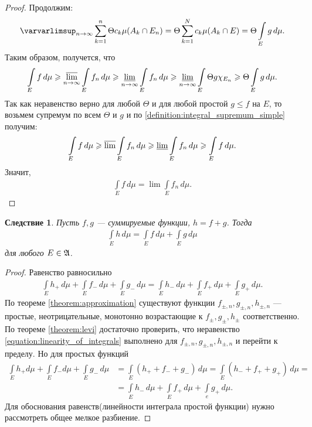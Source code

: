 \documentclass[a4paper,14pt]{extarticle}
\newcounter{theoremCnt}
\theoremstyle{definition}
\theoremstyle{plain}
\theoremstyle{plain}
\theoremstyle{plain}
\newtheorem{crly}[theoremCnt]{Следствие}
\theoremstyle{plain}
\theoremstyle{definition}
\theoremstyle{definition}
\theoremstyle{definition}
\theoremstyle{definition}
\theoremstyle{definition}
\theoremstyle{definition}
\theoremstyle{plain}
\theoremstyle{plain}
\theoremstyle{plain}
\theoremstyle{plain}
\theoremstyle{definition}
\theoremstyle{definition}
\theoremstyle{definition}
\theoremstyle{definition}
\theoremstyle{definition}
\newcommand{\A}{\ensuremath \mathfrak{A}}
\begin{document}
\begin{proof}
Продолжим: \begin{align*}
 \varvarlimsup_{n \to \infty} \sum_{k=1}^{n} \Theta c_k \mu(A_k \cap E_n) = \Theta \sum_{k=1}^{N} c_k \mu(A_k \cap E) = \Theta \int\limits_E g \, d\mu
.\end{align*}  Таким образом, получется, что \begin{align*}
\int\limits_E f \, d\mu \geqslant \varlimsup_{n \to \infty} \int\limits_E f_n\, d\mu \geqslant \varliminf_{n \to \infty} \int\limits_E f_n \, d\mu \geqslant \varliminf_{n \to \infty} \int\limits_E \Theta g \chi_{E_n} \geqslant \Theta \int\limits_E g\, d\mu
.\end{align*} Так как неравенство верно для любой $\Theta$ и для любой простой $g \leqslant f$ на $E $, то возьмем супремум по всем $\Theta$ и $g$ и по \ref{definition:integral_supremum_simple} получим: \begin{align*}
\int\limits_E f \, d\mu \geqslant \varlimsup \int\limits_E f_n \, d\mu \geqslant \varliminf \int\limits_E f_n \, d\mu \geqslant \int\limits_E f \, d\mu
.\end{align*} Значит, \begin{align*}
 \int\limits_E f \, d\mu = \lim \int\limits_E f_n \, d\mu
.\end{align*} 
\end{proof}
\begin{crly}
 Пусть $f,g$ --- суммируемые функции,  $h = f + g$. Тогда \begin{align*}
  \int\limits_E h \, d\mu = \int\limits_E f\, d\mu + \int\limits_E g \, d\mu
 \end{align*} для любого $E \in \A$.
\end{crly}
\begin{proof}
 Равенство равносильно 
 \begin{align}
 \label{equation:linearity_of_integrals}
  \int\limits_E h_+ \, d\mu + \int\limits_E f_- \, d\mu + \int\limits_E g_- \, d\mu = \int\limits_E h_- \, d\mu + \int\limits_E f_+ \, d\mu + \int\limits_E g_+ \, d\mu
 .\end{align} По теореме \ref{theorem:approximation} существуют функции $f_{\pm,n}, g_{\pm,n}, h_{\pm,n}$ --- простые, неотрицательные, монотонно возрастающие к  $f_{\pm}, g_{\pm}, h_{\pm}$ соответственно.
 По теореме \ref{theorem:levi} достаточно проверить, что неравенство \eqref{equation:linearity_of_integrals} выполнено для $f_{\pm,n}, g_{\pm,n}, h_{\pm,n}$ и перейти к пределу.
 Но для простых функций
 \begin{align*}
 \int\limits_E h_+ d\mu + \int\limits_E f_- d\mu + \int\limits_E g_- \,d\mu &= \int\limits_E \left( h_+ + f_- + g_- \right) \,d\mu = \int\limits_E \left( h_- + f_+ + g_+ \right) \, d\mu = \\
  &= \int\limits_E h_- \, d\mu + \int\limits_E f_+ \, d\mu + \int\limits_e g_+ \, d\mu
 .\end{align*}
 Для обоснования равенств(линейности интеграла простой функции) нужно рассмотреть общее мелкое разбиение.
\end{proof}
\end{document}
